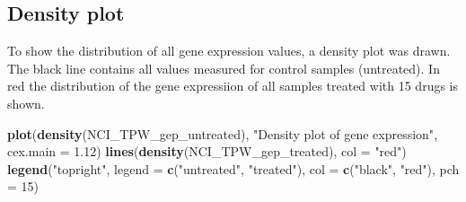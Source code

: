 \documentclass[]{article}
\newenvironment{Shaded}{\begin{snugshade}}{\end{snugshade}}
\newcommand{\CommentTok}[1]{\textcolor[rgb]{0.56,0.35,0.01}{\textit{#1}}}
\newcommand{\ControlFlowTok}[1]{\textcolor[rgb]{0.13,0.29,0.53}{\textbf{#1}}}
\newcommand{\DataTypeTok}[1]{\textcolor[rgb]{0.13,0.29,0.53}{#1}}
\newcommand{\DecValTok}[1]{\textcolor[rgb]{0.00,0.00,0.81}{#1}}
\newcommand{\FloatTok}[1]{\textcolor[rgb]{0.00,0.00,0.81}{#1}}
\newcommand{\KeywordTok}[1]{\textcolor[rgb]{0.13,0.29,0.53}{\textbf{#1}}}
\newcommand{\NormalTok}[1]{#1}
\newcommand{\OperatorTok}[1]{\textcolor[rgb]{0.81,0.36,0.00}{\textbf{#1}}}
\newcommand{\StringTok}[1]{\textcolor[rgb]{0.31,0.60,0.02}{#1}}
\begin{document}
\begin{Shaded}
\end{Shaded}

\hypertarget{density-plot}{%
\subsection{Density plot}\label{density-plot}}

To show the distribution of all gene expression values, a density plot
was drawn. The black line contains all values measured for control
samples (untreated). In red the distribution of the gene expressiion of
all samples treated with 15 drugs is shown.

\begin{Shaded}
\begin{Highlighting}[]
\KeywordTok{plot}\NormalTok{(}\KeywordTok{density}\NormalTok{(NCI_TPW_gep_untreated), }\StringTok{"Density plot of gene expression"}\NormalTok{, }\DataTypeTok{cex.main =} \FloatTok{1.12}\NormalTok{)}
\KeywordTok{lines}\NormalTok{(}\KeywordTok{density}\NormalTok{(NCI_TPW_gep_treated), }\DataTypeTok{col =} \StringTok{"red"}\NormalTok{)}
\KeywordTok{legend}\NormalTok{(}\StringTok{"topright"}\NormalTok{, }\DataTypeTok{legend =} \KeywordTok{c}\NormalTok{(}\StringTok{"untreated"}\NormalTok{, }\StringTok{"treated"}\NormalTok{), }\DataTypeTok{col =} \KeywordTok{c}\NormalTok{(}\StringTok{"black"}\NormalTok{, }\StringTok{"red"}\NormalTok{), }\DataTypeTok{pch =} \DecValTok{15}\NormalTok{)}
\end{Highlighting}
\end{Shaded}
\end{document}
